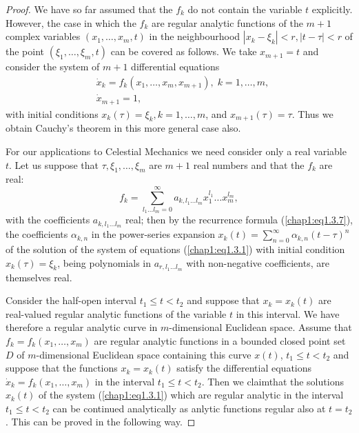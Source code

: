 \begin{proof}
We have so far assumed that the $f_k$ do not contain the variable $t$ explicitly. However, the case in which the $f_k$ are regular analytic functions of the $m+1$ complex variables $(x_1, \ldots, x_m, t)$ in the neighbourhood $|x_k - \xi_k| < r, |t-\tau| < r$ of the point $(\xi_1, \ldots, \xi_m,t)$ can be covered as follows. We take $x_{m+1} =t$ and consider the system of $m+1$ differential equations
\begin{align*}
& \dot{x}_k  =  f_k(x_1, \ldots, x_m, x_{m+1}), \; k=1, \ldots, m, \\
& \dot{x}_{m+1} = 1,
\end{align*}\pageoriginale
with initial conditions $x_k(\tau) = \xi_k, k = 1, \ldots, m$, and $x_{m+1} (\tau) = \tau$. Thus we obtain Cauchy's theorem in this more general case also.

For our applications to Celestial Mechanics we need consider only a real variable $t$. Let us suppose that $\tau, \xi_1, \ldots, \xi_m$ are $m+1$ real numbers and that the $f_k$ are real:
$$
f_k = \sum\limits^\infty_{l_1 \ldots l_m = 0} a_{k, l_1 \ldots l_m} x^{l_1}_1 \ldots x^{l_m}_m,
$$
with the coefficients $a_{k,l_1 \ldots l_m}$ real; then by the recurrence formula (\ref{chap1:eq1.3.7}), the coefficients $\alpha_{k,n}$ in the power-series expansion $x_k(t) = \sum\limits^\infty_{n=0} \alpha_{k,n} (t-\tau)^n$ of the solution of the system of equations (\ref{chap1:eq1.3.1}) with initial condition $x_k(\tau) = \xi_k$, being polynomials in $a_{r, l_1 \ldots l_m}$ with non-negative coefficients, are themselves real.

Consider the half-open interval $t_1 \leq t < t_2$ and suppose  that $x_k = x_k(t)$ are real-valued regular analytic functions of the variable $t$ in this interval. We have therefore a regular analytic curve in $m$-dimensional Euclidean space. Assume that $f_k = f_k(x_1, \ldots, x_m)$ are regular analytic functions in a bounded closed point set $D$ of $m$-dimensional Euclidean space containing this curve $x(t)$, $t_1 \leq t < t_2$ and suppose that the functions $x_k = x_k (t)$ satisfy the differential equations $\dot{x}_k = f_k (x_1, \ldots, x_m)$ in the interval $t_1 \leq t < t_2$. Then we claim\pageoriginale  that the solutions $x_k(t)$ of the system (\ref{chap1:eq1.3.1}) which are regular analytic in the interval $t_1 \leq t < t_2$ can be continued analytically as anlytic functions regular also at $t=t_2$. This can be proved in the following way.
\end{proof}

